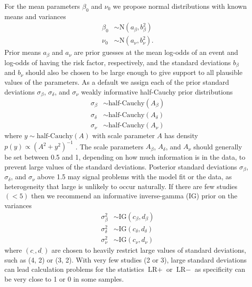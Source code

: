 \documentclass[AMA,STIX1COL]{WileyNJD-v2}
\begin{document}
For the mean parameters $\beta_0$ and $\nu_0$ we propose normal distributions with known means and variances
\begin{align}
\beta_0 &\sim \mbox{N}(a_\beta, b_\beta^2) \label{eq:beta0} \\
\nu_0 &\sim \mbox{N}(a_\nu, b_\nu^2). \label{eq:nu0}
\end{align}
\noindent Prior means $a_\beta$ and $a_\nu$ are prior guesses at the mean log-odds of an event and log-odds of having the risk factor, respectively, and the standard deviations $b_\beta$ and $b_\nu$ should also be chosen to be large enough to give support to all plausible values of the parameters. As a default we assign each of the prior standard deviations $\sigma_\beta$, $\sigma_\delta$, and $\sigma_\nu$ weakly informative half-Cauchy prior distributions
\begin{align}
\sigma_\beta &\sim \mbox{half-Cauchy}(A_\beta) \label{eq:sigmabeta} \\
\sigma_\delta &\sim \mbox{half-Cauchy}(A_\delta) \label{eq:sigmadelta} \\
\sigma_\nu &\sim \mbox{half-Cauchy}(A_\nu) \label{eq:sigmanu}
\end{align}
where $y \sim \mbox{half-Cauchy}(A)$ with scale parameter $A$ has density $p(y) \propto (A^2 + y^2)^{-1}$ \citep{gelman2006prior}. The scale parameters $A_\beta$, $A_\delta$, and $A_\nu$ should generally be set between 0.5 and 1, depending on how much information is in the data, to prevent large values of the standard deviations. Posterior standard deviations $\sigma_\beta$, $\sigma_\delta$, and $\sigma_\nu$ above 1.5 may signal problems with the model fit or the data, as heterogeneity that large is unlikely to occur naturally. If there are few studies $(< 5)$ then we recommend an informative inverse-gamma (IG) prior on the variances
\begin{align}
\sigma_\beta^2 &\sim \mbox{IG}(c_\beta, d_\beta)  \nonumber \\
\sigma_\delta^2 &\sim \mbox{IG}(c_\delta, d_\delta)  \nonumber \\
\sigma_\nu^2 &\sim \mbox{IG}(c_\nu, d_\nu) \nonumber
\end{align}
\noindent where $(c_\cdot, d_\cdot)$ are chosen to heavily restrict large values of standard deviations, such as (4, 2) or (3, 2). With very few studies (2 or 3), large standard deviations can lead calculation problems for the statistics $\mbox{LR}+$ or $\mbox{LR}-$ as specificity can be very close to 1 or 0 in some samples.
\end{document}
